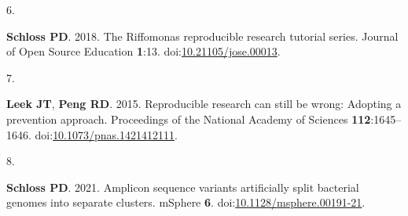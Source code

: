 \documentclass[
]{article}
\newlength{\cslhangindent}
\newlength{\csllabelwidth}
\newlength{\cslentryspacingunit} %
\newenvironment{CSLReferences}[2] %
 {%
  \setlength{\parindent}{0pt}
  \ifodd #1
  \let\oldpar\par
  \def\par{\hangindent=\cslhangindent\oldpar}
  \fi
  \setlength{\parskip}{#2\cslentryspacingunit}
 }%
 {}
\newcommand{\CSLLeftMargin}[1]{\parbox[t]{\csllabelwidth}{#1}}
\newcommand{\CSLRightInline}[1]{\parbox[t]{\linewidth - \csllabelwidth}{#1}\break}
\begin{document}
\begin{CSLReferences}{0}{1}
\leavevmode{}%
\CSLLeftMargin{6. }%
\CSLRightInline{\textbf{Schloss PD}. 2018. The {R}iffomonas reproducible
research tutorial series. Journal of Open Source Education
\textbf{1}:13.
doi:\href{https://doi.org/10.21105/jose.00013}{10.21105/jose.00013}.}

\leavevmode{}%
\CSLLeftMargin{7. }%
\CSLRightInline{\textbf{Leek JT}, \textbf{Peng RD}. 2015. Reproducible
research can still be wrong: Adopting a prevention approach. Proceedings
of the National Academy of Sciences \textbf{112}:1645--1646.
doi:\href{https://doi.org/10.1073/pnas.1421412111}{10.1073/pnas.1421412111}.}

\leavevmode{}%
\CSLLeftMargin{8. }%
\CSLRightInline{\textbf{Schloss PD}. 2021. Amplicon sequence variants
artificially split bacterial genomes into separate clusters. {mSphere}
\textbf{6}.
doi:\href{https://doi.org/10.1128/msphere.00191-21}{10.1128/msphere.00191-21}.}

\end{CSLReferences}
\end{document}
